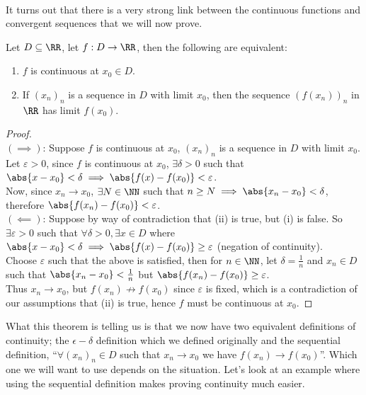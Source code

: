 \documentclass[../real_analysis.tex]{subfiles}
\begin{document}
        \paragraph{}
        It turns out that there is a very strong link between the continuous functions and convergent sequences that we will now prove.
        \begin{theorem}\label{seq-cont}
            Let $D\subseteq\RR$, let $f: D\to\RR$, then the following are equivalent:
            \begin{enumerate}[label={\upshape(\roman*)}]
                \item $f$ is continuous at $x_0\in D$.
                \item If $(x_n)_n$ is a sequence in $D$ with limit $x_0$, then the sequence $(f(x_n))_n$ in $\RR$ has limit $f(x_0)$.
            \end{enumerate}
        \end{theorem}
        \begin{proof}\\
            $(\implies)$: Suppose $f$ is continuous at $x_0$, $(x_n)_n$ is a sequence in $D$ with limit $x_0$.\\
            Let $\varepsilon>0$, since $f$ is continuous at $x_0$, $\exists\delta>0$ such that $\abs{x-x_0}<\delta\implies\abs{f(x)-f(x_0)}<\varepsilon$.\\
            Now, since $x_n\to x_0$, $\exists N\in\NN$ such that $n\geq N\implies\abs{x_n-x_0}<\delta$, therefore $\abs{f(x_n)-f(x_0)}<\varepsilon$.\\
            $(\impliedby)$: Suppose by way of contradiction that (ii) is true, but (i) is false. So $\exists\varepsilon>0$ such that $\forall\delta>0, \exists x\in D$ where $\abs{x-x_0}<\delta\implies\abs{f(x)-f(x_0)}\geq\varepsilon$ (negation of continuity).\\
            Choose $\varepsilon$ such that the above is satisfied, then for $n\in\NN$, let $\delta=\frac{1}{n}$ and $x_n\in D$ such that $\abs{x_n-x_0}<\frac{1}{n}$ but $\abs{f(x_n)-f(x_0)}\geq\varepsilon$.\\
            Thus $x_n\to x_0$, but $f(x_n)\not\to f(x_0)$ since $\varepsilon$ is fixed, which is a contradiction of our assumptions that (ii) is true, hence $f$ must be continuous at $x_0$.
        \end{proof}
        What this theorem is telling us is that we now have two equivalent definitions of continuity; the $\epsilon-\delta$ definition which we defined originally and the sequential definition, ``$\forall(x_n)_n\in D$ such that $x_n\to x_0$ we have $f(x_n)\to f(x_0)$''. Which one we will want to use depends on the situation. Let's look at an example where using the sequential definition makes proving continuity much easier.
\end{document}
